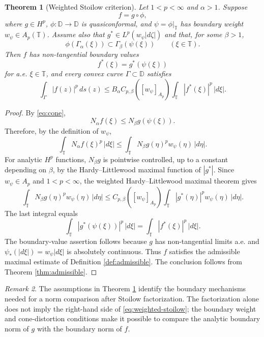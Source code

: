 \documentclass[11pt]{article}
\newtheorem{theorem}{Theorem}[section]
\theoremstyle{definition}
\theoremstyle{remark}
\newtheorem{remark}[theorem]{Remark}
\newcommand{\D}{\mathbb D}
\newcommand{\T}{\mathbb T}
\newcommand{\ds}{\,ds}
\begin{document}
\begin{theorem}[Weighted Stoilow criterion]\label{thm:weighted-stoilow}
Let $1<p<\infty$ and $\alpha>1$. Suppose
\[
   f=g\circ\phi,
\]
where $g\in H^p$, $\phi:\D\to\D$ is quasiconformal, and $\psi=\phi|_\T$ has boundary weight $w_\psi\in A_p(\T)$. Assume also that $g^*\in L^p(w_\psi|d\zeta|)$ and that, for some $\beta>1$,
\begin{equation}\label{eq:cone}
   \phi(\Gamma_\alpha(\xi))\subset \Gamma_\beta(\psi(\xi))
   \qquad (\xi\in\T).
\end{equation}
Then $f$ has non-tangential boundary values
\[
   f^*(\xi)=g^*(\psi(\xi))
\]
for a.e. $\xi\in\T$, and every convex curve $\Gamma\subset\D$ satisfies
\begin{equation}\label{eq:weighted-stoilow}
   \int_\Gamma |f(z)|^p\ds(z)
   \le B_\alpha C_{p,\beta}([w_\psi]_{A_p})
      \int_\T |f^*(\xi)|^p\,|d\xi|.
\end{equation}
\end{theorem}

\begin{proof}
By \eqref{eq:cone},
\[
   N_\alpha f(\xi)\le N_\beta g(\psi(\xi)).
\]
Therefore, by the definition of $w_\psi$,
\[
   \int_\T N_\alpha f(\xi)^p\,|d\xi|
   \le
   \int_\T N_\beta g(\eta)^p w_\psi(\eta)\,|d\eta|.
\]
For analytic $H^p$ functions, $N_\beta g$ is pointwise controlled, up to a constant depending on $\beta$, by the Hardy--Littlewood maximal function of $|g^*|$. Since $w_\psi\in A_p$ and $1<p<\infty$, the weighted Hardy--Littlewood maximal theorem gives
\[
   \int_\T N_\beta g(\eta)^p w_\psi(\eta)\,|d\eta|
   \le C_{p,\beta}([w_\psi]_{A_p})
      \int_\T |g^*(\eta)|^p w_\psi(\eta)\,|d\eta|.
\]
The last integral equals
\[
   \int_\T |g^*(\psi(\xi))|^p\,|d\xi|
   =\int_\T |f^*(\xi)|^p\,|d\xi|.
\]
The boundary-value assertion follows because $g$ has non-tangential limits a.e. and $\psi_*(|d\xi|)=w_\psi|d\xi|$ is absolutely continuous. Thus $f$ satisfies the admissible maximal estimate of Definition \ref{def:admissible}. The conclusion follows from Theorem \ref{thm:admissible}.
\end{proof}

\begin{remark}
The assumptions in Theorem \ref{thm:weighted-stoilow} identify the boundary mechanisms needed for a norm comparison after Stoilow factorization. The factorization alone does not imply the right-hand side of \eqref{eq:weighted-stoilow}; the boundary weight and cone-distortion conditions make it possible to compare the analytic boundary norm of $g$ with the boundary norm of $f$.
\end{remark}
\end{document}
